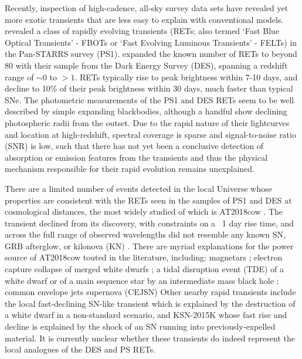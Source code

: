 \documentclass[fleqn,usenatbib,]{mnras}
\begin{document}
Recently, inspection of high-cadence, all-sky survey data sets have revealed yet more exotic transients that are less easy to explain with conventional models. \citet{Drout2014} revealed a class of rapidly evolving transients (RETs; also termed `Fast Blue Optical Transients' - FBOTs or `Fast Evolving Luminous Transients' - FELTs) in the Pan-STARRS survey (PS1). \citet{Pursiainen2018} expanded the known number of RETs to beyond 80 with their sample from the Dark Energy Survey (DES), spanning a redshift range of $\sim 0$ to $>1$. RETs typically rise to peak brightness within 7-10 days, and decline to 10\% of their peak brightness within 30 days, much faster than typical SNe. The photometric measurements of the PS1 and DES RETs seem to be well described by simple expanding blackbodies, although a handful show declining photospheric radii from the outset. Due to the rapid nature of their lightcurves and location at high-redshift, spectral coverage is sparse and signal-to-noise ratio (SNR) is low, such that there has not yet been a conclusive detection of absorption or emission features from the transients and thus the physical mechanism responsible for their rapid evolution remains unexplained.

There are a limited number of events detected in the local Universe whose properties are consistent with the RETs seen in the samples of PS1 and DES at cosmological distances, the most widely studied of which is AT2018cow \citep[e.g.][]{Prentice2018,Perley2019}. The transient declined from its discovery, with constraints on a ~1 day rise time, and across the full range of observed wavelengths did not resemble any known SN, GRB afterglow, or kilonova (KN) \citep{Ho2019}. There are myriad explanations for the power source of AT2018cow touted in the literature, including: magnetars \citep{Mohan2020}; electron capture collapse of merged white dwarfs \citep{Lyutikov2019}; a tidal disruption event (TDE) of a white dwarf \citep{Kuin2019} or of a main sequence star by an intermediate mass black hole \citep{Perley2019}; common envelope jets supernova (CEJSN) \citep{Soker2019}
Other nearby rapid transients include the local fast-declining SN-like transient \citep{McBrien2019} which is explained by the destruction of a white dwarf in a non-standard scenario, and KSN-2015K \citep{Rest2018} whose fast rise and decline is explained by the shock of an SN running into previously-expelled material.  It is currently unclear whether these transients do indeed represent the local analogues of the DES and PS RETs.
\end{document}

